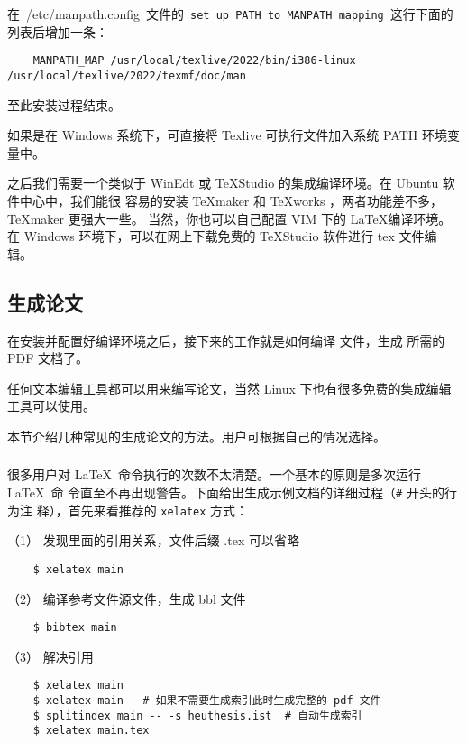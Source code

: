 在~{/etc/manpath.config}~文件的~\texttt{set up PATH to  MANPATH mapping}~这行下面的列表后增加一条：

\begin{lstlisting}
    MANPATH_MAP /usr/local/texlive/2022/bin/i386-linux /usr/local/texlive/2022/texmf/doc/man
\end{lstlisting}

至此安装过程结束。

如果是在 Windows 系统下，可直接将 Texlive 可执行文件加入系统 PATH 环境变量中。

之后我们需要一个类似于 WinEdt 或 TeXStudio 的集成编译环境。在 Ubuntu 软件中心中，我们能很
容易的安装 \TeX{}maker 和 \TeX{}works ，两者功能差不多， \TeX{}maker 更强大一些。
当然，你也可以自己配置 VIM 下的 \LaTeX{}编译环境。在 Windows 环境下，可以在网上下载免费的
TeXStudio 软件进行 tex 文件编辑。

\subsection{生成论文}
\label{sec:generate-thesis}

在安装并配置好编译环境之后，接下来的工作就是如何编译 \XeLaTeX{} 文件，生成
所需的 PDF 文档了。

任何文本编辑工具都可以用来编写论文，当然 Linux 下也有很多免费的集成编辑工具可以使用。

本节介绍几种常见的生成论文的方法。用户可根据自己的情况选择。

\subsubsection{\XeLaTeX}
\label{sec:xelatex}

很多用户对 \LaTeX\ 命令执行的次数不太清楚。一个基本的原则是多次运行 \LaTeX\ 命
令直至不再出现警告。下面给出生成示例文档的详细过程（\texttt{\#} 开头的行为注
释），首先来看推荐的 \texttt{xelatex} 方式：

（1） 发现里面的引用关系，文件后缀 .tex 可以省略

\begin{lstlisting}
    $ xelatex main
\end{lstlisting}

（2） 编译参考文件源文件，生成 bbl 文件

\begin{lstlisting}
    $ bibtex main
\end{lstlisting}

（3） 解决引用

\begin{lstlisting}
    $ xelatex main
    $ xelatex main   # 如果不需要生成索引此时生成完整的 pdf 文件
    $ splitindex main -- -s heuthesis.ist  # 自动生成索引
    $ xelatex main.tex
\end{lstlisting}

